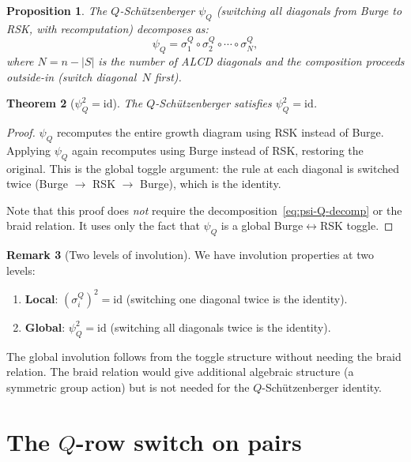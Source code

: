 \documentclass[11pt]{article}
\theoremstyle{plain}
\newtheorem{theorem}{Theorem}
\newtheorem{proposition}[theorem]{Proposition}
\theoremstyle{definition}
\newtheorem{remark}[theorem]{Remark}
\begin{document}
\begin{proposition}
\label{prop:psi-decomp}
The $Q$-Sch\"utzenberger $\psi_Q$ (switching all diagonals
from Burge to RSK, with recomputation) decomposes as:
\begin{equation}\label{eq:psi-Q-decomp}
  \psi_Q = \sigma_1^Q \circ \sigma_2^Q \circ \cdots
    \circ \sigma_N^Q,
\end{equation}
where $N = n - |S|$ is the number of ALCD diagonals and the
composition proceeds outside-in (switch diagonal~$N$ first).
\end{proposition}

\begin{theorem}[$\psi_Q^2 = \mathrm{id}$]
\label{thm:psi-Q-involution}
The $Q$-Sch\"utzenberger satisfies $\psi_Q^2 = \mathrm{id}$.
\end{theorem}

\begin{proof}
$\psi_Q$ recomputes the entire growth diagram using RSK
instead of Burge.  Applying $\psi_Q$ again recomputes using
Burge instead of RSK, restoring the original.  This is the
global toggle argument: the rule at each diagonal is switched
twice (Burge $\to$ RSK $\to$ Burge), which is the identity.

Note that this proof does \emph{not} require the
decomposition~\eqref{eq:psi-Q-decomp} or the braid relation.
It uses only the fact that $\psi_Q$ is a global
Burge$\leftrightarrow$RSK toggle.
\end{proof}

\begin{remark}[Two levels of involution]
\label{rem:two-levels}
We have involution properties at two levels:
\begin{enumerate}
  \item \textbf{Local}: $(\sigma_i^Q)^2 = \mathrm{id}$
    (switching one diagonal twice is the identity).
  \item \textbf{Global}: $\psi_Q^2 = \mathrm{id}$ (switching
    all diagonals twice is the identity).
\end{enumerate}
The global involution follows from the toggle structure without
needing the braid relation.  The braid relation would give
additional algebraic structure (a symmetric group action) but
is not needed for the $Q$-Sch\"utzenberger identity.
\end{remark}


\section{The $Q$-row switch on pairs}
\label{sec:Q-row-pairs}
\end{document}
